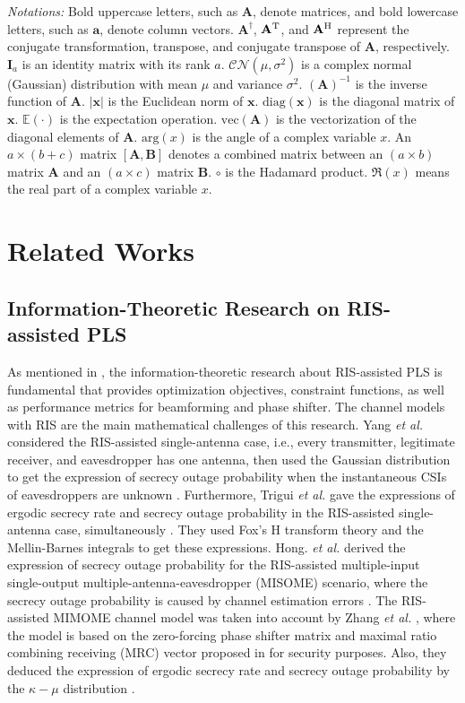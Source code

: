 \documentclass[journal]{IEEEtran}
\theoremstyle{definition}
\begin{document}
\textsl{Notations:} Bold uppercase letters, such as $\mathbf{A}$, denote matrices, and bold lowercase letters, such as $\mathbf{a}$, denote column vectors. $\mathbf{A}^{\dagger}$, $\mathbf{A}^{\rm{T}}$, and $\mathbf{A}^{\rm{H}}$ represent the conjugate transformation, transpose, and conjugate transpose of $\mathbf{A}$, respectively. $\mathbf{I}_a$ is an identity matrix with its rank $a$. $\mathcal{CN}(\mu,\sigma^2)$ is a complex normal (Gaussian) distribution with mean $\mu$ and variance $\sigma^2$. $(\mathbf{A})^{-1}$ is the inverse function of $\mathbf{A}$. $|\mathbf{x}|$ is the Euclidean norm of $\mathbf{x}$. $\text{diag}(\mathbf{x})$ is the diagonal matrix of $\mathbf{x}$. $\mathbb{E}(\cdot)$ is the expectation operation. $\text{vec}(\mathbf{A})$ is the vectorization of the diagonal elements of $\mathbf{A}$. $\text{arg}(x)$ is the angle of a complex variable $x$. An $a\times(b+c)$ matrix $[\mathbf{A},\mathbf{B}]$ denotes a combined matrix between an $(a\times b)$ matrix $\mathbf{A}$ and an $(a\times c)$ matrix $\mathbf{B}$. $\circ$ is the Hadamard product. $\mathfrak{R}(x)$ means the real part of a complex variable $x$.

\section{Related Works}\label{surveys}

\subsection{Information-Theoretic Research on RIS-assisted PLS}
As mentioned in \cite{Zhangtifs2021}, the information-theoretic research about RIS-assisted PLS is fundamental that provides optimization objectives, constraint functions, as well as performance metrics for beamforming and phase shifter. The channel models with RIS are the main mathematical challenges of this research. Yang \textsl{et al.} considered the RIS-assisted single-antenna case, i.e., every transmitter, legitimate receiver, and eavesdropper has one antenna, then used the Gaussian distribution to get the expression of secrecy outage probability when the instantaneous CSIs of eavesdroppers are unknown \cite{Yang2020}. Furthermore, Trigui \textsl{et al.} gave the expressions of ergodic secrecy rate and secrecy outage probability in the RIS-assisted single-antenna case, simultaneously \cite{Trigui2021}. They used Fox's H transform theory and the Mellin-Barnes integrals to get these expressions. Hong. \textsl{et al.} derived the expression of secrecy outage probability for the RIS-assisted multiple-input single-output multiple-antenna-eavesdropper (MISOME) scenario, where the secrecy outage probability is caused by channel estimation errors \cite{hong2020outage}. The RIS-assisted MIMOME channel model was taken into account by Zhang \textsl{et al.} \cite{Zhangtifs2021}, where the model is based on the zero-forcing phase shifter matrix and maximal ratio combining receiving (MRC) vector proposed in \cite{hou2019mimo} for security purposes. Also, they deduced the expression of ergodic secrecy rate and secrecy outage probability by the $\kappa-\mu$ distribution \cite{Bhargav2018}.
\end{document}
